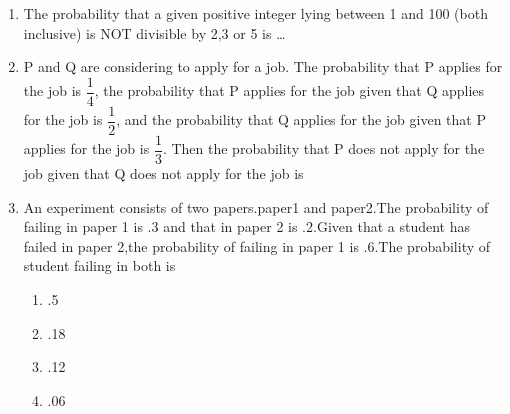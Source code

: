 \renewcommand{\theequation}{\theenumi}
\renewcommand{\thefigure}{\theenumi}
\renewcommand{\thetable}{\theenumi}
\begin{enumerate}[label=\thesection.\arabic*.,ref=\thesection.\theenumi]

\item The probability that a given positive integer lying between 1 and 100 (both inclusive) is NOT divisible by 2,3 or 5 is \dots
\\
\solution

%
\item P and Q are considering to apply for a job. The probability that P applies for the job is $\dfrac{1}{4}$, the probability that P applies for the job given that Q applies for the job is $\dfrac{1}{2}$, and the probability that Q applies for the job given that P applies for the job is $\dfrac{1}{3}$. Then the probability that P does not apply for the job given that Q does not apply for the job is 

\begin{enumerate}
\end{enumerate}
\solution

%
\item An experiment consists of two papers.paper1 and paper2.The probability of failing in paper 1 is .3 and that in paper 2 is .2.Given that a student has failed in paper 2,the probability of failing in paper 1 is .6.The probability of student failing in both is\\
\begin{enumerate}
    \setlength\itemsep{2em}
\item .5 
\item .18 
\item .12 
\item .06 
\end{enumerate}
%
\solution

%



\end{enumerate}
